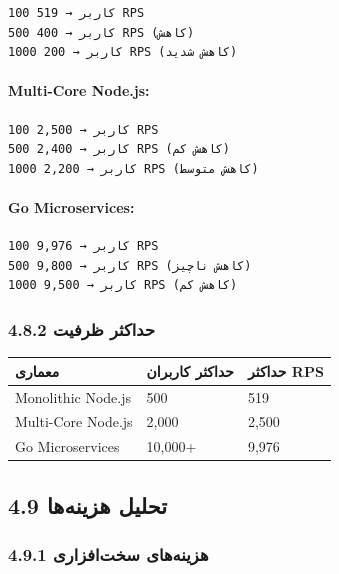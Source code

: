 \documentclass[
]{article}
\newcounter{none} %
\begin{document}
\begin{verbatim}
100 کاربر → 519 RPS
500 کاربر → 400 RPS (کاهش)
1000 کاربر → 200 RPS (کاهش شدید)
\end{verbatim}

\paragraph{Multi-Core Node.js:}\label{multi-core-node.js}

\begin{verbatim}
100 کاربر → 2,500 RPS
500 کاربر → 2,400 RPS (کاهش کم)
1000 کاربر → 2,200 RPS (کاهش متوسط)
\end{verbatim}

\paragraph{Go Microservices:}\label{go-microservices}

\begin{verbatim}
100 کاربر → 9,976 RPS
500 کاربر → 9,800 RPS (کاهش ناچیز)
1000 کاربر → 9,500 RPS (کاهش کم)
\end{verbatim}

\subsubsection{4.8.2 حداکثر
ظرفیت}\label{ux62dux62fux627ux6a9ux62bux631-ux638ux631ux641ux6ccux62a}

{\def\LTcaptype{none} %
\begin{longtable}[]{@{}lll@{}}
\toprule\noalign{}
معماری & حداکثر کاربران & حداکثر RPS \\
\midrule\noalign{}
\endhead
\bottomrule\noalign{}
\endlastfoot
Monolithic Node.js & 500 & 519 \\
Multi-Core Node.js & 2,000 & 2,500 \\
Go Microservices & 10,000+ & 9,976 \\
\end{longtable}
}

\subsection{4.9 تحلیل
هزینه‌ها}\label{ux62aux62dux644ux6ccux644-ux647ux632ux6ccux646ux647ux647ux627}

\subsubsection{4.9.1 هزینه‌های
سخت‌افزاری}\label{ux647ux632ux6ccux646ux647ux647ux627ux6cc-ux633ux62eux62aux627ux641ux632ux627ux631ux6cc}
\end{document}
